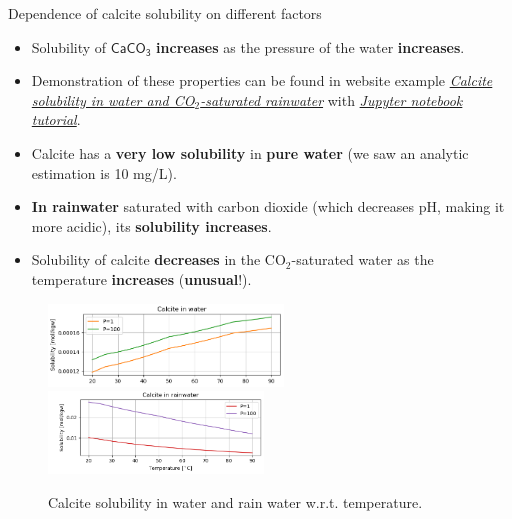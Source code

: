\begin{frame}{Dependence of calcite solubility on different factors}
\small
\begin{itemize}
\item Solubility of $\mathsf{CaCO_3}$ \textbf{increases} as the pressure of the water \textbf{increases}.
\pause
\item Demonstration of these properties can be found in website example 
\href{https://reaktoro.org/applications/solubility/solubility-calcite-on-acidity-and-temperature.html}{\textcolor{indigo(dye)}{\it Calcite solubility in water and CO$_2$-saturated rainwater}} with \href{https://github.com/mtsveta/reaktoro-v2-workshop/blob/main/tutorials/solubility/solubility-calcite-in-water-rainwater.ipynb}{\textcolor{indigo(dye)}{\it Jupyter notebook tutorial}}.
%
\pause
\item Calcite has a \textbf{very low solubility} in \textbf{pure water} (we saw an analytic estimation is 10 \mbox{mg/L}).
\pause
\item \textbf{In rainwater} saturated with carbon dioxide (which decreases pH, making it more acidic), its \textbf{solubility increases}.
%
%
\pause
\item Solubility of calcite \textbf{decreases} in the CO$_2$-saturated water  as the temperature \textbf{increases} ({\bf unusual}!).
\end{itemize}

\begin{figure}\centering
	\includegraphics[height=2.2cm]{figures/chemical-equilibrium/calcite-solubility-water.png} \quad
	\includegraphics[height=2.2cm]{figures/chemical-equilibrium/calcite-solubility-rainwater.png}
	\caption*{\footnotesize Calcite solubility in water and rain water w.r.t. temperature.}
\end{figure}
\end{frame}

